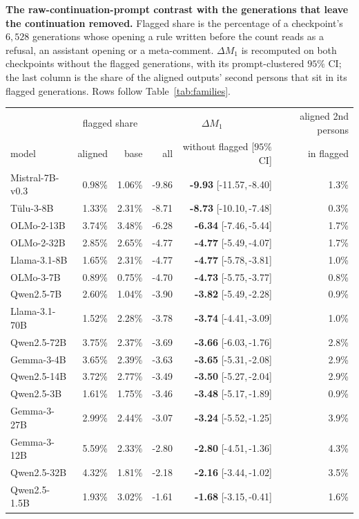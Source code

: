 \par\medskip\noindent\begin{minipage}{\linewidth}\sabittablo\small
\caption{\textbf{The raw-continuation-prompt contrast with the generations that leave the continuation removed.} Flagged share is the percentage of a checkpoint's $6{,}528$ generations whose opening a rule written before the count reads as a refusal, an assistant opening or a meta-comment. $\Delta M_1$ is recomputed on both checkpoints without the flagged generations, with its prompt-clustered $95\%$ CI; the last column is the share of the aligned outputs' second persons that sit in its flagged generations. Rows follow Table~\ref{tab:families}.}
\label{tab:q2kip}
\centering\begin{tabular}{lrrrrr}
\toprule
 & \multicolumn{2}{c}{flagged share} & \multicolumn{2}{c}{$\Delta M_1$} & aligned 2nd persons \\
\cmidrule(lr){2-3}\cmidrule(lr){4-5}
model & aligned & base & all & without flagged [$95\%$ CI] & in flagged \\
\midrule
Mistral-7B-v0.3 & 0.98\% & 1.06\% & -9.86 & \textbf{-9.93} [-11.57,\,-8.40] & 1.3\% \\
T\"ulu-3-8B & 1.33\% & 2.31\% & -8.71 & \textbf{-8.73} [-10.10,\,-7.48] & 0.3\% \\
OLMo-2-13B & 3.74\% & 3.48\% & -6.28 & \textbf{-6.34} [-7.46,\,-5.44] & 1.7\% \\
OLMo-2-32B & 2.85\% & 2.65\% & -4.77 & \textbf{-4.77} [-5.49,\,-4.07] & 1.7\% \\
Llama-3.1-8B & 1.65\% & 2.31\% & -4.77 & \textbf{-4.77} [-5.78,\,-3.81] & 1.0\% \\
OLMo-3-7B & 0.89\% & 0.75\% & -4.70 & \textbf{-4.73} [-5.75,\,-3.77] & 0.8\% \\
Qwen2.5-7B & 2.60\% & 1.04\% & -3.90 & \textbf{-3.82} [-5.49,\,-2.28] & 0.9\% \\
Llama-3.1-70B & 1.52\% & 2.28\% & -3.78 & \textbf{-3.74} [-4.41,\,-3.09] & 1.0\% \\
Qwen2.5-72B & 3.75\% & 2.37\% & -3.69 & \textbf{-3.66} [-6.03,\,-1.76] & 2.8\% \\
Gemma-3-4B & 3.65\% & 2.39\% & -3.63 & \textbf{-3.65} [-5.31,\,-2.08] & 2.9\% \\
Qwen2.5-14B & 3.72\% & 2.77\% & -3.49 & \textbf{-3.50} [-5.27,\,-2.04] & 2.9\% \\
Qwen2.5-3B & 1.61\% & 1.75\% & -3.46 & \textbf{-3.48} [-5.17,\,-1.89] & 0.9\% \\
Gemma-3-27B & 2.99\% & 2.44\% & -3.07 & \textbf{-3.24} [-5.52,\,-1.25] & 3.9\% \\
Gemma-3-12B & 5.59\% & 2.33\% & -2.80 & \textbf{-2.80} [-4.51,\,-1.36] & 4.3\% \\
Qwen2.5-32B & 4.32\% & 1.81\% & -2.18 & \textbf{-2.16} [-3.44,\,-1.02] & 3.5\% \\
Qwen2.5-1.5B & 1.93\% & 3.02\% & -1.61 & \textbf{-1.68} [-3.15,\,-0.41] & 1.6\% \\
\bottomrule
\end{tabular}
\end{minipage}\par\medskip
